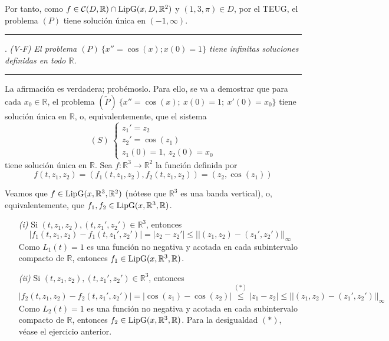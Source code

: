 \documentclass[11pt]{report}
\newcommand{\R}{\mathbb R}
\begin{document}
Por tanto, como $f \in \mathcal{C}(D,\R) \cap \textup{LipG}(x,D,\R^2)$ y $(1,3,\pi) \in D$, por el TEUG, el problema $(P)$ tiene solución única en $(-1,\infty)$.

\vspace{4mm}

\hrule

\vspace{4mm}

. \textit{(V-F) El problema $(P) \ \{x''=\cos(x); x(0)=1\}$ tiene infinitas soluciones definidas en todo $\R$.}

\vspace{4mm}

\hrule

\vspace{4mm}

La afirmación es verdadera; probémoslo. Para ello, se va a demostrar que para cada $x_0 \in \R$, el problema $(\widetilde{P}) \ \{x''=\cos(x); \ x(0)=1; \ x'(0)=x_0\}$ tiene solución única en $\R$, o, equivalentemente, que el sistema
\[(S) \ \begin{cases}
    z_1'=z_2 \\
    z_2'=\cos(z_1) \\
    z_1(0)=1, \ z_2(0)=x_0
\end{cases}\]
tiene solución única en $\R$. Sea $f \colon \R^3 \to \R^2$ la función definida por
\[f(t,z_1,z_2)=(f_1(t,z_1,z_2),f_2(t,z_1,z_2))=(z_2,\cos(z_1))\]

Veamos que $f \in \textup{LipG}(x,\R^3,\R^2)$ (nótese que $\R^3$ es una banda vertical), o, equivalentemente, que $f_1,f_2 \in \textup{LipG}(x,\R^3,\R)$.

\begin{itemize}
    \item[\textit{(i)}] Si $(t,z_1,z_2),(t,z_1',z_2') \in \R^3$, entonces
    \[|f_1(t,z_1,z_2)-f_1(t,z_1',z_2')|=|z_2-z_2'|\leq ||(z_1,z_2)-(z_1',z_2')||_\infty\]
    Como $L_1(t)=1$ es una función no negativa y acotada en cada subintervalo compacto de $\R$, entonces $f_1 \in \textup{LipG}(x,\R^3,\R)$.
    \item[\textit{(ii)}] Si $(t,z_1,z_2),(t,z_1',z_2') \in \R^3$, entonces
    \[|f_2(t,z_1,z_2)-f_2(t,z_1',z_2')|=|\cos(z_1)-\cos(z_2)|\overset{(\ast)}{\leq} |z_1-z_2| \leq ||(z_1,z_2)-(z_1',z_2')||_\infty\]
    Como $L_2(t)=1$ es una función no negativa y acotada en cada subintervalo compacto de $\R$, entonces $f_2 \in \textup{LipG}(x,\R^3,\R)$. Para la desigualdad $(\ast)$, véase el ejercicio anterior.
\end{itemize}
\end{document}
